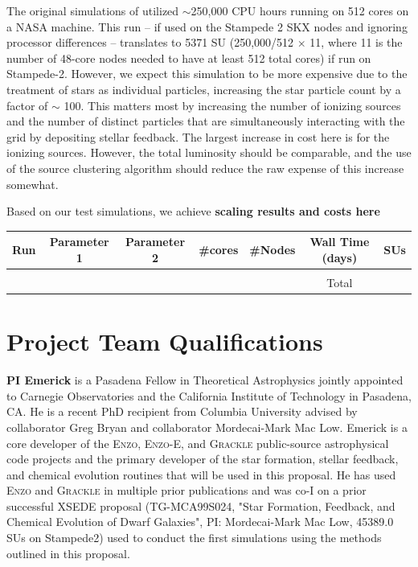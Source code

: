 \documentclass[12pt]{article} %
\begin{document}
The original simulations of \cite{Wise2012a} utilized $\sim$250,000 CPU hours running on 512 cores on a NASA machine. This run -- if used on the Stampede 2 SKX nodes and ignoring processor differences -- translates to 5371 SU (250,000/512 $\times$ 11, where 11 is the number of 48-core nodes needed to have at least 512 total cores) if run on Stampede-2. However, we expect this simulation to be more expensive due to the treatment of stars as individual particles, increasing the star particle count by a factor of $\sim$ 100. This matters most by increasing the number of ionizing sources and the number of distinct particles that are simultaneously interacting with the grid by depositing stellar feedback. The largest increase in cost here is for the ionizing sources. However, the total luminosity should be comparable, and the use of the source clustering algorithm should reduce the raw expense of this increase somewhat.

Based on our test simulations, we achieve \textbf{scaling results and costs here}


\begin{tabular}{c|c|c|c|c|c|c}
\hline
\hline
 Run & Parameter 1 & Parameter 2 & \#cores & \#Nodes & Wall Time (days) & \textbf{SUs} \\
 \hline
     & & & & & & \\
 \hline
 & & & & & Total &
\end{tabular}


\section{Project Team Qualifications}

\textbf{PI Emerick} is a Pasadena Fellow in Theoretical Astrophysics jointly appointed to Carnegie Observatories and the California Institute of Technology in Pasadena, CA. He is a recent PhD recipient from Columbia University advised by collaborator Greg Bryan and collaborator Mordecai-Mark Mac Low. Emerick is a core developer of the \textsc{Enzo}, \textsc{Enzo-E}, and \textsc{Grackle} public-source astrophysical code projects and the primary developer of the star formation, stellar feedback, and chemical evolution routines that will be used in this proposal. He has used \textsc{Enzo} and \textsc{Grackle} in multiple prior publications \citep{Emerick2015,Emerick2018a,Emerick2018b,Emerick2019a,Emerick2019b} and was co-I on a prior successful XSEDE proposal (TG-MCA99S024, "Star Formation, Feedback, and Chemical Evolution of Dwarf Galaxies", PI: Mordecai-Mark Mac Low, 45389.0 SUs on Stampede2) used to conduct the first simulations using the methods outlined in this proposal.
\end{document}
